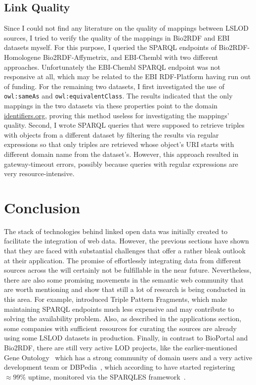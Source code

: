 \documentclass[runningheads]{llncs}
\begin{document}
    \subsection{Link Quality}
    Since I could not find any literature on the quality of mappings between LSLOD sources, I tried to verify the quality of the mappings in Bio2RDF and EBI datasets myself.
    For this purpose, I queried the SPARQL endpoints of Bio2RDF-Homologene Bio2RDF-Affymetrix, and EBI-Chembl with two different approaches.
    Unfortunately the EBI-Chembl SPARQL endpoint was not responsive at all, which may be related to the EBI RDF-Platform having run out of funding.
    For the remaining two datasets, I first investigated the use of \texttt{owl:sameAs} and \texttt{owl:equivalentClass}.
    The results indicated that the only mappings in the two datasets via these properties point to the domain \url{identifiers.org}, proving this method useless for investigating the mappings' quality.
    Second, I wrote SPARQL queries that were supposed to retrieve triples with objects from a different dataset by filtering the results via regular expressions so that only triples are retrieved whose object's URI starts with different domain name from the dataset's.
    However, this approach resulted in gateway-timeout errors, possibly because queries with regular expressions are very resource-intensive.

    \section{Conclusion}
    The stack of technologies behind linked open data was initially created to facilitate the integration of web data.
    However, the previous sections have shown that they are faced with substantial challenges that offer a rather bleak outlook at their application.
    The promise of effortlessly integrating data from different sources across the will certainly not be fulfillable in the near future.
    Nevertheless, there are also some promising movements in the semantic web community that are worth mentioning and show that still a lot of research is being conducted in this area.
    For example, \citet{verborgh2016triple} introduced Triple Pattern Fragments, which make maintaining SPARQL endpoints much less expensive and may contribute to solving the availability problem.
    Also, as described in the applications section, some companies with sufficient resources for curating the sources are already using some LSLOD datasets in production.
    Finally, in contrast to BioPortal and Bio2RDF, there are still very active LOD projects, like the earlier-mentioned Gene Ontology~\citep{gene2015gene} which has a strong community of domain users and a very active development team or DBPedia~\citep{auer2007dbpedia}, which according to \citet{kamdar2019enabling} have started registering $\approx99\%$ uptime, monitored via the SPARQLES framework~\citep{vandenbussche2017sparqles}.

%
%
%
    
    
%
\end{document}

